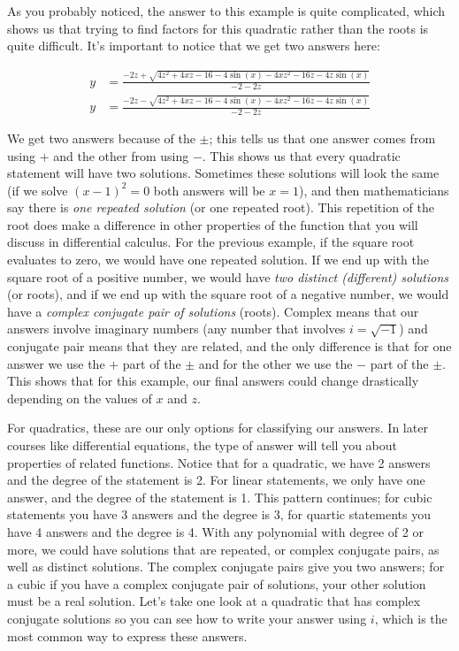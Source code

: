 As you probably noticed, the answer to this example is quite complicated, which shows us that trying to find factors for this quadratic rather than the roots is quite difficult. It's important to notice that we get two answers here:

\begin{equation*}
	\begin{split}
		y & = \frac{-2z + \sqrt{ 4z^2+4xz-16-4 \sin{(x)} - 4xz^2-16z-4z \sin{(x)} }}{-2-2z}\\
		y & = \frac{-2z - \sqrt{ 4z^2+4xz-16-4 \sin{(x)} - 4xz^2-16z-4z \sin{(x)} }}{-2-2z}
	\end{split}
\end{equation*}

\noindent
We get two answers because of the $\pm$; this tells us that one answer comes from using $+$ and the other from using $-$. This shows us that every quadratic statement will have two solutions. Sometimes these solutions will look the same (if we solve $(x-1)^2 = 0$ both answers will be $x=1$), and then mathematicians say there is \emph{one repeated solution} (or one repeated root). This repetition of the root does make a difference in other properties of the function that you will discuss in differential calculus. For the previous example, if the square root evaluates to zero, we would have one repeated solution. If we end up with the square root of a positive number, we would have \emph{two distinct (different) solutions} (or roots), and if we end up with the square root of a negative number, we would have a \emph{complex conjugate pair of solutions} (roots). Complex means that our answers involve imaginary numbers (any number that involves $i=\sqrt{-1}$) and conjugate pair means that they are related, and the only difference is that for one answer we use the $+$ part of the $\pm$ and for the other we use the $-$ part of the $\pm$. This shows that for this example, our final answers could change drastically depending on the values of $x$ and $z$.

For quadratics, these are our only options for classifying our answers. In later courses like differential equations, the type of answer will tell you about properties of related functions. Notice that for a quadratic, we have 2 answers and the degree of the statement is 2. For linear statements, we only have one answer, and the degree of the statement is 1. This pattern continues; for cubic statements you have 3 answers and the degree is 3, for quartic statements you have 4 answers and the degree is 4. With any polynomial with degree of 2 or more, we could have solutions that are repeated, or complex conjugate pairs, as well as distinct solutions. The complex conjugate pairs give you two answers; for a cubic if you have a complex conjugate pair of solutions, your other solution must be a real solution. Let's take one look at a quadratic that has complex conjugate solutions so you can see how to write your answer using $i$, which is the most common way to express these answers.

